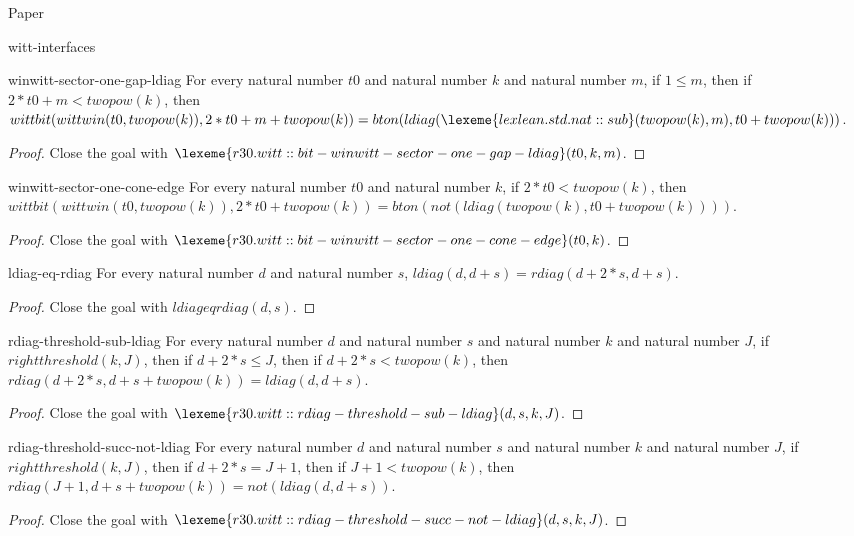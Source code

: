\begin{lexlean}{Paper}
\begin{section}{witt-interfaces}
  \begin{theorem}{winwitt-sector-one-gap-ldiag}
  For every natural number \(t0\) and natural number \(k\) and natural number \(m\), if \(1 ≤ m\), then if \(2 * t0 + m < twopow(k)\), then \(wittbit(wittwin(t0, twopow(k)), 2 * t0 + m + twopow(k)) = bton(ldiag(\lexeme{lexlean.std.nat::sub}(twopow(k), m), t0 + twopow(k)))\).
  \begin{proof}
  Close the goal with \(\lexeme{r30.witt::bit-winwitt-sector-one-gap-ldiag}(t0, k, m)\).
  \end{proof}
  \end{theorem}

  \begin{theorem}{winwitt-sector-one-cone-edge}
  For every natural number \(t0\) and natural number \(k\), if \(2 * t0 < twopow(k)\), then \(wittbit(wittwin(t0, twopow(k)), 2 * t0 + twopow(k)) = bton(not(ldiag(twopow(k), t0 + twopow(k))))\).
  \begin{proof}
  Close the goal with \(\lexeme{r30.witt::bit-winwitt-sector-one-cone-edge}(t0, k)\).
  \end{proof}
  \end{theorem}

  \begin{theorem}{ldiag-eq-rdiag}
  For every natural number \(d\) and natural number \(s\), \(ldiag(d, d + s) = rdiag(d + 2 * s, d + s)\).
  \begin{proof}
  Close the goal with \(ldiageqrdiag(d, s)\).
  \end{proof}
  \end{theorem}

  \begin{theorem}{rdiag-threshold-sub-ldiag}
  For every natural number \(d\) and natural number \(s\) and natural number \(k\) and natural number \(J\), if \(rightthreshold(k, J)\), then if \(d + 2 * s ≤ J\), then if \(d + 2 * s < twopow(k)\), then \(rdiag(d + 2 * s, d + s + twopow(k)) = ldiag(d, d + s)\).
  \begin{proof}
  Close the goal with \(\lexeme{r30.witt::rdiag-threshold-sub-ldiag}(d, s, k, J)\).
  \end{proof}
  \end{theorem}

  \begin{theorem}{rdiag-threshold-succ-not-ldiag}
  For every natural number \(d\) and natural number \(s\) and natural number \(k\) and natural number \(J\), if \(rightthreshold(k, J)\), then if \(d + 2 * s = J + 1\), then if \(J + 1 < twopow(k)\), then \(rdiag(J + 1, d + s + twopow(k)) = not(ldiag(d, d + s))\).
  \begin{proof}
  Close the goal with \(\lexeme{r30.witt::rdiag-threshold-succ-not-ldiag}(d, s, k, J)\).
  \end{proof}
  \end{theorem}


\end{section}
\end{lexlean}
